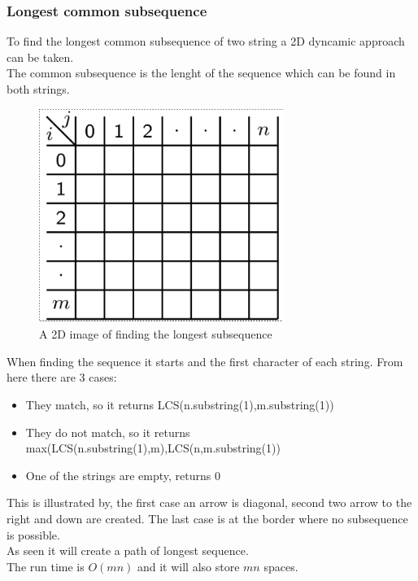 \documentclass[12pt, a4paper]{article}
\begin{document}
				\subsubsection{Longest common subsequence}
					To find the longest common subsequence of two string a 2D dyncamic approach can be taken.\\
					The common subsequence is the lenght of the sequence which can be found in both strings.\\
					\begin{figure}[h!]
							  \centering
							  \includegraphics[width=300px]{assets/LCS.png}
							  \caption{A 2D image of finding the longest subsequence}
					\end{figure}
					When finding the sequence it starts and the first character of each string. From here there are 3 cases:
					\begin{itemize}
							  \item They match, so it returns LCS(n.substring(1),m.substring(1))
								\item They do not match, so it returns max(LCS(n.substring(1),m),LCS(n,m.substring(1))
								\item One of the strings are empty, returns 0
					\end{itemize}
					This is illustrated by, the first case an arrow is diagonal, second two arrow to the right and down are created. The last case is at the border where no subsequence is possible.\\
					As seen it will create a path of longest sequence.\\
					The run time is $O(mn)$ and it will also store $mn$ spaces.
\end{document}
